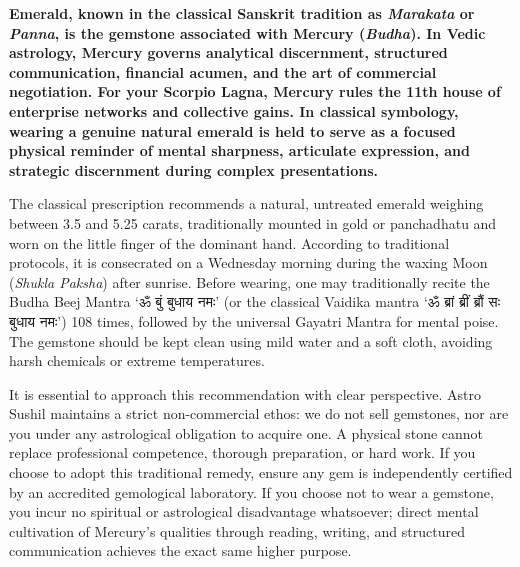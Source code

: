\label{topic59}

{\fontsize{9.5}{13.8}\selectfont\bfseries\color{DeepSlate} Emerald, known in the classical Sanskrit tradition as \textit{Marakata} or \textit{Panna}, is the gemstone associated with Mercury (\textit{Budha}). In Vedic astrology, Mercury governs analytical discernment, structured communication, financial acumen, and the art of commercial negotiation. For your Scorpio Lagna, Mercury rules the 11th house of enterprise networks and collective gains. In classical symbology, wearing a genuine natural emerald is held to serve as a focused physical reminder of mental sharpness, articulate expression, and strategic discernment during complex presentations.}\par\vspace{2mm}

{\fontsize{9}{13}\selectfont The classical prescription recommends a natural, untreated emerald weighing between 3.5 and 5.25 carats, traditionally mounted in gold or panchadhatu and worn on the little finger of the dominant hand. According to traditional protocols, it is consecrated on a Wednesday morning during the waxing Moon (\textit{Shukla Paksha}) after sunrise. Before wearing, one may traditionally recite the Budha Beej Mantra ‘ॐ बुं बुधाय नमः’ (or the classical Vaidika mantra ‘ॐ ब्रां ब्रीं ब्रौं सः बुधाय नमः’) 108 times, followed by the universal Gayatri Mantra for mental poise. The gemstone should be kept clean using mild water and a soft cloth, avoiding harsh chemicals or extreme temperatures.}\par\vspace{1.8mm}

{\fontsize{9}{13}\selectfont It is essential to approach this recommendation with clear perspective. Astro Sushil maintains a strict non-commercial ethos: we do not sell gemstones, nor are you under any astrological obligation to acquire one. A physical stone cannot replace professional competence, thorough preparation, or hard work. If you choose to adopt this traditional remedy, ensure any gem is independently certified by an accredited gemological laboratory. If you choose not to wear a gemstone, you incur no spiritual or astrological disadvantage whatsoever; direct mental cultivation of Mercury's qualities through reading, writing, and structured communication achieves the exact same higher purpose.}\par\vspace{1.8mm}

